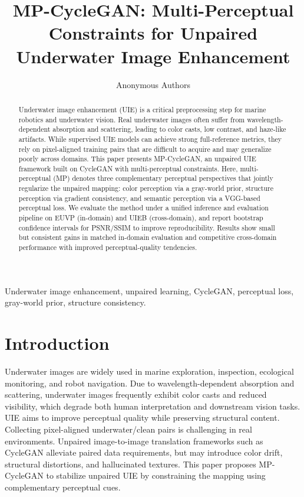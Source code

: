 \documentclass{IEEEtran}
\title{MP-CycleGAN: Multi-Perceptual Constraints for Unpaired Underwater Image Enhancement}
\author{Anonymous Authors}
\begin{document}
\maketitle
\begin{abstract}
Underwater image enhancement (UIE) is a critical preprocessing step for marine robotics and underwater vision. Real underwater images often suffer from wavelength-dependent absorption and scattering, leading to color casts, low contrast, and haze-like artifacts. While supervised UIE models can achieve strong full-reference metrics, they rely on pixel-aligned training pairs that are difficult to acquire and may generalize poorly across domains. This paper presents MP-CycleGAN, an unpaired UIE framework built on CycleGAN with multi-perceptual constraints. Here, multi-perceptual (MP) denotes three complementary perceptual perspectives that jointly regularize the unpaired mapping: color perception via a gray-world prior, structure perception via gradient consistency, and semantic perception via a VGG-based perceptual loss. We evaluate the method under a unified inference and evaluation pipeline on EUVP (in-domain) and UIEB (cross-domain), and report bootstrap confidence intervals for PSNR/SSIM to improve reproducibility. Results show small but consistent gains in matched in-domain evaluation and competitive cross-domain performance with improved perceptual-quality tendencies.
\end{abstract}
\begin{IEEEkeywords}
Underwater image enhancement, unpaired learning, CycleGAN, perceptual loss, gray-world prior, structure consistency.
\end{IEEEkeywords}
\section{Introduction}
Underwater images are widely used in marine exploration, inspection, ecological monitoring, and robot navigation. Due to wavelength-dependent absorption and scattering, underwater images frequently exhibit color casts and reduced visibility, which degrade both human interpretation and downstream vision tasks. UIE aims to improve perceptual quality while preserving structural content.
Collecting pixel-aligned underwater/clean pairs is challenging in real environments. Unpaired image-to-image translation frameworks such as CycleGAN alleviate paired data requirements, but may introduce color drift, structural distortions, and hallucinated textures. This paper proposes MP-CycleGAN to stabilize unpaired UIE by constraining the mapping using complementary perceptual cues.
\end{document}
